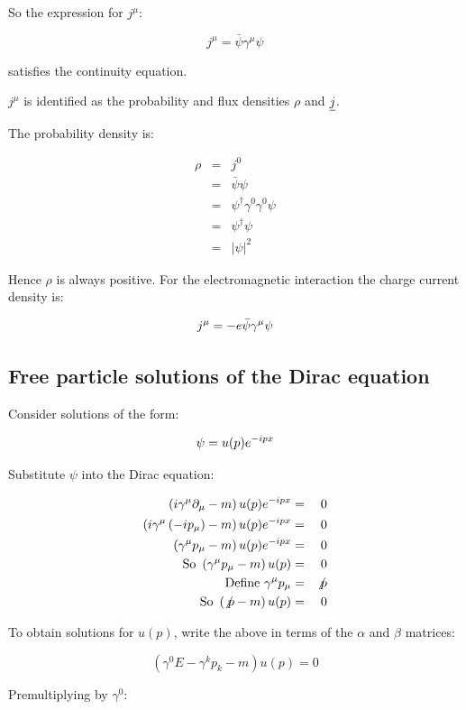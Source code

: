 So the expression for $j^{\mu}$:

\[
  j^{\mu} = \bar{\psi}\gamma^{\mu}\psi
\]

satisfies the continuity equation.

$j^{\mu}$ is identified as the probability and flux densities $\rho$ and $\underline{j}$.

The probability density is:

\begin{eqnarray*}
  \rho & = & j^0 \\
  & = & \bar{\psi}\psi \\
  & = & \psi^{\dagger}\gamma^0\gamma^0\psi \\
  & = & \psi^{\dagger}\psi \\
  & = & |\psi|^2
\end{eqnarray*}

Hence $\rho$ is always positive.  For the electromagnetic interaction the charge current density is:

\[
  j^{\mu} = -e\bar{\psi}\gamma^{\mu}\psi
\]

\subsection{Free particle solutions of the Dirac equation}

Consider solutions of the form:

\[
  \psi = u(p)e^{-ipx}
\]

Substitute $\psi$ into the Dirac equation:

\begin{eqnarray*}
  \left(i\gamma^{\mu}\partial_{\mu} - m\right)u(p)e^{-ipx} & = & 0 \\
  \left(i\gamma^{\mu}\left(-ip_{\mu}\right)-m\right)u(p)e^{-ipx} & = & 0 \\
  \left(\gamma^{\mu}p_{\mu} - m\right)u(p)e^{-ipx} & = & 0 \\
  \textrm{So } \left(\gamma^{\mu}p_{\mu}-m\right)u(p) & = & 0 \\
  \textrm{Define } \gamma^{\mu}p_{\mu} & = & \not{p} \\
  \textrm{So } \left(\not{p} - m\right)u(p) & = & 0
\end{eqnarray*}

To obtain solutions for $u(p)$, write the above in terms of the $\alpha$ and $\beta$ matrices:

\[
  \left(\gamma^0E - \gamma^kp_k - m\right)u(p) = 0
\]

Premultiplying by $\gamma^0$:

